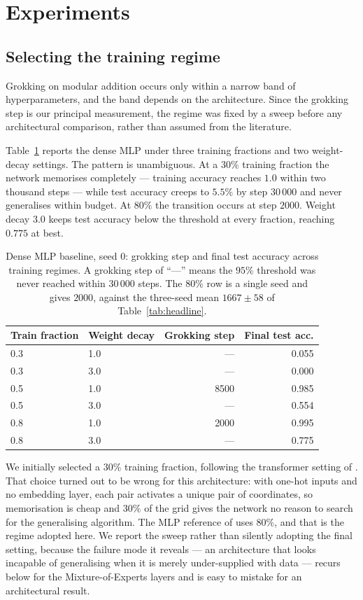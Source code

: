 \section{Experiments}
\label{sec:experiments}

\subsection{Selecting the training regime}
\label{sec:protocol}

Grokking on modular addition occurs only within a narrow band of
hyperparameters, and the band depends on the architecture. Since the grokking
step is our principal measurement, the regime was fixed by a sweep before any
architectural comparison, rather than assumed from the literature.

Table~\ref{tab:regime} reports the dense MLP under three training fractions
and two weight-decay settings. The pattern is unambiguous. At a $30\%$
training fraction the network memorises completely --- training accuracy
reaches $1.0$ within two thousand steps --- while test accuracy creeps to
$5.5\%$ by step $30\,000$ and never generalises within budget. At $80\%$ the
transition occurs at step $2000$. Weight decay $3.0$ keeps test accuracy below the threshold at every fraction, reaching $0.775$ at best.

\begin{table}[t]
\centering
\caption{Dense MLP baseline, seed $0$: grokking step and final test accuracy
across training regimes. A grokking step of ``---'' means the $95\%$ threshold
was never reached within $30\,000$ steps. The $80\%$ row is a single seed and
gives $2000$, against the three-seed mean $1667 \pm 58$ of
Table~\ref{tab:headline}.}
\label{tab:regime}
\begin{tabular}{llrr}
\toprule
Train fraction & Weight decay & Grokking step & Final test acc. \\
\midrule
0.3 & 1.0 & --- & 0.055 \\
0.3 & 3.0 & --- & 0.000 \\
0.5 & 1.0 & 8500 & 0.985 \\
0.5 & 3.0 & --- & 0.554 \\
0.8 & 1.0 & 2000 & 0.995 \\
0.8 & 3.0 & --- & 0.775 \\
\bottomrule
\end{tabular}
\end{table}

We initially selected a $30\%$ training fraction, following the transformer
setting of \citet{nanda2023progress}. That choice turned out to be wrong for
this architecture: with one-hot inputs and no embedding layer, each pair
activates a unique pair of coordinates, so memorisation is cheap and $30\%$ of
the grid gives the network no reason to search for the generalising algorithm.
The MLP reference of \citet{bussmann2023modadd} uses $80\%$, and that is the
regime adopted here. We report the sweep rather than silently adopting the
final setting, because the failure mode it reveals --- an architecture that
looks incapable of generalising when it is merely under-supplied with data ---
recurs below for the Mixture-of-Experts layers and is easy to mistake for an
architectural result.

